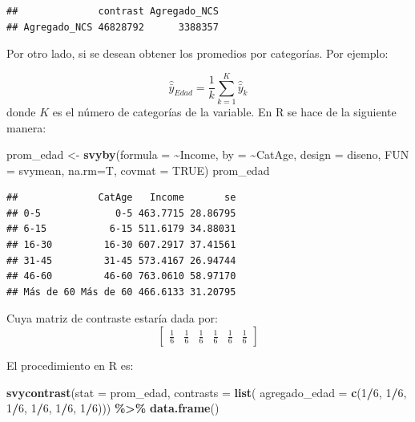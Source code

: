 \documentclass[
  12pt,
]{book}
\newenvironment{Shaded}{\begin{snugshade}}{\end{snugshade}}
\newcommand{\AttributeTok}[1]{\textcolor[rgb]{0.13,0.29,0.53}{#1}}
\newcommand{\ConstantTok}[1]{\textcolor[rgb]{0.56,0.35,0.01}{#1}}
\newcommand{\DecValTok}[1]{\textcolor[rgb]{0.00,0.00,0.81}{#1}}
\newcommand{\FunctionTok}[1]{\textcolor[rgb]{0.13,0.29,0.53}{\textbf{#1}}}
\newcommand{\NormalTok}[1]{#1}
\newcommand{\OtherTok}[1]{\textcolor[rgb]{0.56,0.35,0.01}{#1}}
\newcommand{\SpecialCharTok}[1]{\textcolor[rgb]{0.81,0.36,0.00}{\textbf{#1}}}
\begin{document}
\begin{verbatim}
##              contrast Agregado_NCS
## Agregado_NCS 46828792      3388357
\end{verbatim}

Por otro lado, si se desean obtener los promedios por categorías. Por ejemplo:

\[
\hat{\bar{y}}_{Edad} = \frac{1}{k}\sum_{k=1}^K\hat{\bar{y}}_{k}
\]
donde \(K\) es el número de categorías de la variable. En R se hace de la siguiente manera:

\begin{Shaded}
\begin{Highlighting}[]
\NormalTok{prom\_edad }\OtherTok{\textless{}{-}} \FunctionTok{svyby}\NormalTok{(}\AttributeTok{formula =} \SpecialCharTok{\textasciitilde{}}\NormalTok{Income,}
                   \AttributeTok{by =} \SpecialCharTok{\textasciitilde{}}\NormalTok{CatAge,}
                   \AttributeTok{design =}\NormalTok{  diseno,}
                   \AttributeTok{FUN =}\NormalTok{ svymean,}
                   \AttributeTok{na.rm=}\NormalTok{T,}
                   \AttributeTok{covmat =} \ConstantTok{TRUE}\NormalTok{)}
\NormalTok{prom\_edad}
\end{Highlighting}
\end{Shaded}

\begin{verbatim}
##              CatAge   Income       se
## 0-5             0-5 463.7715 28.86795
## 6-15           6-15 511.6179 34.88031
## 16-30         16-30 607.2917 37.41561
## 31-45         31-45 573.4167 26.94744
## 46-60         46-60 763.0610 58.97170
## Más de 60 Más de 60 466.6133 31.20795
\end{verbatim}

Cuya matriz de contraste estaría dada por:
\[
\left[\begin{array}{cccccc}
\frac{1}{6} & \frac{1}{6} & \frac{1}{6} & \frac{1}{6} & \frac{1}{6} & \frac{1}{6}
\end{array}\right]
\]

El procedimiento en R es:

\begin{Shaded}
\begin{Highlighting}[]
\FunctionTok{svycontrast}\NormalTok{(}\AttributeTok{stat =}\NormalTok{ prom\_edad,}
            \AttributeTok{contrasts =} \FunctionTok{list}\NormalTok{(}
                             \AttributeTok{agregado\_edad =} \FunctionTok{c}\NormalTok{(}\DecValTok{1}\SpecialCharTok{/}\DecValTok{6}\NormalTok{, }\DecValTok{1}\SpecialCharTok{/}\DecValTok{6}\NormalTok{, }\DecValTok{1}\SpecialCharTok{/}\DecValTok{6}\NormalTok{, }\DecValTok{1}\SpecialCharTok{/}\DecValTok{6}\NormalTok{, }\DecValTok{1}\SpecialCharTok{/}\DecValTok{6}\NormalTok{, }\DecValTok{1}\SpecialCharTok{/}\DecValTok{6}\NormalTok{)))             }\SpecialCharTok{\%\textgreater{}\%} \FunctionTok{data.frame}\NormalTok{()}
\end{Highlighting}
\end{Shaded}
\end{document}
